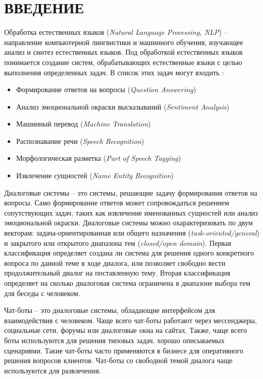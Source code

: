 \section*{ВВЕДЕНИЕ}
Обработка естественных языков (\textit{Natural Language Processing, NLP})
-- направление компьютерной лингвистики и машинного обучения,
изучающее анализ и синтез естественных языков.
Под обработкой естественных языков  понимается создание систем,
обрабатывающих естественные языки с целью выполнения определенных задач.
В список этих задач могут входить \cite{cursera.nlp}:
\begin{itemize}
    \item Формирование ответов на вопросы (\textit{Question Answering})
    \item Анализ эмоциональной окраски высказываний (\textit{Sentiment Analysis})
    \item Машинный перевод (\textit{Machine Translation})
    \item Распознавание речи (\textit{Speech Recognition})
    \item Морфологическая разметка (\textit{Part of Speech Tagging})
    \item Извлечение сущностей (\textit{Name Entity Recognition})
\end{itemize}

Диалоговые системы -- это системы, решающие задачу формирования ответов на вопросы.
Само формирование ответов может сопровождаться решением сопутствующих задач, таких как
извлечение именованных сущностей или анализ эмоциональной окраски.
Диалоговые системы можно охарактеризовать по двум векторам:
задача-ориентированная или общего назначения (\textit{task-oriented/general})
и закрытого или открытого диапазона тем (\textit{closed/open domain}).
Первая классификация определяет создана ли система для решения одного конкретного
вопроса по данной теме в ходе диалога, или позволяет свободно вести продолжительный
диалог на поставленную тему.
Вторая классификация определяет на сколько диалоговая система ограничена в диапазоне выбора тем
для беседы с человеком.

Чат-боты -- это диалоговые системы, обладающие интерфейсом для взаимодействия с человеком.
Чаще всего чат-боты работают через мессенджеры, социальные сети, форумы или диалоговые окна на сайтах.
Также, чаще всего боты используются для решения типовых задач, хорошо описываемых сценариями.
Такие чат-боты часто применяются в бизнесе для оперативного решения вопросов клиентов.
Чат-боты со свободной темой диалога чаще используются для развлечения.

